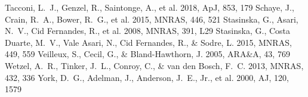 \documentclass[twocolumn]{aastex631}
\begin{document}
\begin{thebibliography}{}
 Tacconi, L.~J., Genzel, R., Saintonge, A., et al. 2018, ApJ, 853, 179
 Schaye, J., Crain, R.~A., Bower, R.~G., et al. 2015, MNRAS, 446, 521
 Stasinska, G., Asari, N.~V., Cid Fernandes, R., et al. 2008, MNRAS, 391, L29
 Stasinska, G., Costa Duarte, M.~V., Vale Asari, N., Cid Fernandes, R., \& Sodre, L. 2015, MNRAS, 449, 559
 Veilleux, S., Cecil, G., \& Bland-Hawthorn, J. 2005, ARA\&A, 43, 769
 Wetzel, A.~R., Tinker, J.~L., Conroy, C., \& van den Bosch, F.~C. 2013, MNRAS, 432, 336
 York, D.~G., Adelman, J., Anderson, J.~E., Jr., et al. 2000, AJ, 120, 1579
\end{thebibliography}
\end{document}

